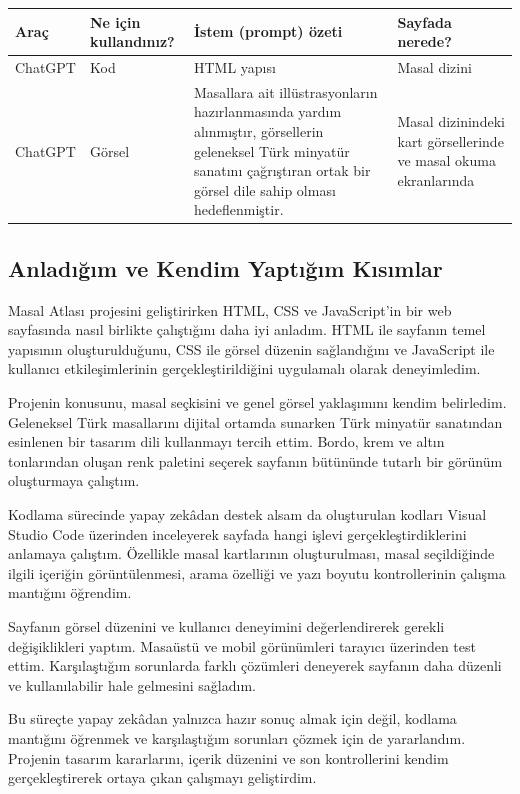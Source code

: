 \documentclass[12pt,a4paper]{article}
\begin{document}
\begin{longtable}{@{}p{2.6cm}p{3.6cm}p{4.2cm}p{3.4cm}@{}}
\toprule
\textbf{Araç} & \textbf{Ne için kullandınız?} & \textbf{İstem (prompt) özeti} & \textbf{Sayfada nerede?} \\
\midrule
\endhead
\relax ChatGPT  & Kod & HTML yapısı & Masal dizini \\
\relax ChatGPT  & Görsel & Masallara ait illüstrasyonların hazırlanmasında yardım alınmıştır, görsellerin geleneksel Türk minyatür sanatını çağrıştıran ortak bir görsel dile sahip olması hedeflenmiştir. & Masal dizinindeki kart görsellerinde ve masal okuma ekranlarında \\
\bottomrule
\end{longtable}

\subsection{Anladığım ve Kendim Yaptığım Kısımlar}

Masal Atlası projesini geliştirirken HTML, CSS ve JavaScript'in bir web sayfasında nasıl birlikte çalıştığını daha iyi anladım. HTML ile sayfanın temel yapısının oluşturulduğunu, CSS ile görsel düzenin sağlandığını ve JavaScript ile kullanıcı etkileşimlerinin gerçekleştirildiğini uygulamalı olarak deneyimledim.

Projenin konusunu, masal seçkisini ve genel görsel yaklaşımını kendim belirledim. Geleneksel Türk masallarını dijital ortamda sunarken Türk minyatür sanatından esinlenen bir tasarım dili kullanmayı tercih ettim. Bordo, krem ve altın tonlarından oluşan renk paletini seçerek sayfanın bütününde tutarlı bir görünüm oluşturmaya çalıştım.

Kodlama sürecinde yapay zekâdan destek alsam da oluşturulan kodları Visual Studio Code üzerinden inceleyerek sayfada hangi işlevi gerçekleştirdiklerini anlamaya çalıştım. Özellikle masal kartlarının oluşturulması, masal seçildiğinde ilgili içeriğin görüntülenmesi, arama özelliği ve yazı boyutu kontrollerinin çalışma mantığını öğrendim.

Sayfanın görsel düzenini ve kullanıcı deneyimini değerlendirerek gerekli değişiklikleri yaptım. Masaüstü ve mobil görünümleri tarayıcı üzerinden test ettim. Karşılaştığım sorunlarda farklı çözümleri deneyerek sayfanın daha düzenli ve kullanılabilir hale gelmesini sağladım.

Bu süreçte yapay zekâdan yalnızca hazır sonuç almak için değil, kodlama mantığını öğrenmek ve karşılaştığım sorunları çözmek için de yararlandım. Projenin tasarım kararlarını, içerik düzenini ve son kontrollerini kendim gerçekleştirerek ortaya çıkan çalışmayı geliştirdim.
\end{document}
